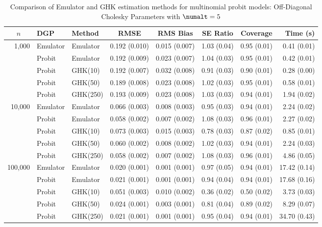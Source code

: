 \begin{table}[htbp]
\centering
\footnotesize
\begin{tabular}{@{}rllrrrrr@{}}
\toprule
\multicolumn{1}{c}{$n$} & \multicolumn{1}{l}{DGP} & \multicolumn{1}{l}{Method} & \multicolumn{1}{c}{RMSE} & \multicolumn{1}{c}{RMS Bias} & \multicolumn{1}{c}{SE Ratio} & \multicolumn{1}{c}{Coverage} & \multicolumn{1}{r}{Time (s)} \\
\midrule
\multirow{5}{*}{1,000} & Emulator & Emulator & 0.192 (0.010) & 0.015 (0.007) & 1.03 (0.04) & 0.95 (0.01) & 0.41 (0.01) \\
 & Probit & Emulator & 0.192 (0.009) & 0.023 (0.007) & 1.04 (0.03) & 0.95 (0.01) & 0.42 (0.01) \\
 & Probit & GHK(10) & 0.192 (0.007) & 0.032 (0.008) & 0.91 (0.03) & 0.90 (0.01) & 0.28 (0.00) \\
 & Probit & GHK(50) & 0.189 (0.008) & 0.023 (0.008) & 1.02 (0.03) & 0.95 (0.01) & 0.58 (0.01) \\
 & Probit & GHK(250) & 0.193 (0.009) & 0.023 (0.008) & 1.03 (0.03) & 0.94 (0.01) & 1.94 (0.02) \\
\midrule
\multirow{5}{*}{10,000} & Emulator & Emulator & 0.066 (0.003) & 0.008 (0.003) & 0.95 (0.03) & 0.94 (0.01) & 2.24 (0.02) \\
 & Probit & Emulator & 0.058 (0.002) & 0.007 (0.002) & 1.08 (0.03) & 0.96 (0.01) & 2.27 (0.02) \\
 & Probit & GHK(10) & 0.073 (0.003) & 0.015 (0.003) & 0.78 (0.03) & 0.87 (0.02) & 0.85 (0.01) \\
 & Probit & GHK(50) & 0.060 (0.002) & 0.008 (0.002) & 1.02 (0.03) & 0.94 (0.01) & 2.24 (0.03) \\
 & Probit & GHK(250) & 0.058 (0.002) & 0.007 (0.002) & 1.08 (0.03) & 0.96 (0.01) & 4.86 (0.05) \\
\midrule
\multirow{5}{*}{100,000} & Emulator & Emulator & 0.020 (0.001) & 0.001 (0.001) & 0.97 (0.05) & 0.94 (0.01) & 17.42 (0.14) \\
 & Probit & Emulator & 0.021 (0.001) & 0.001 (0.001) & 0.94 (0.04) & 0.94 (0.01) & 17.68 (0.16) \\
 & Probit & GHK(10) & 0.051 (0.003) & 0.010 (0.002) & 0.36 (0.02) & 0.50 (0.02) & 3.73 (0.03) \\
 & Probit & GHK(50) & 0.024 (0.001) & 0.003 (0.001) & 0.81 (0.04) & 0.89 (0.02) & 8.29 (0.07) \\
 & Probit & GHK(250) & 0.021 (0.001) & 0.001 (0.001) & 0.95 (0.04) & 0.94 (0.01) & 34.70 (0.43) \\
\bottomrule
\end{tabular}
\caption{Comparison of Emulator and GHK estimation methods for multinomial probit models: Off-Diagonal Cholesky Parameters with $\numalt=5$}
\label{tab:emulator_vs_ghk:5:llower}
\end{table}